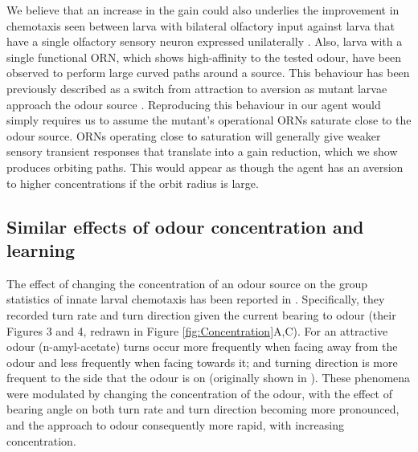 \documentclass[11pt,a4paper]{article}
\newcommand{\todoML}[1]{\todo[author=ML,color=white, size=\tiny,inline]{#1}}
\begin{document}
We believe that an increase in the gain could also underlies the improvement in chemotaxis seen between larva with bilateral olfactory input against larva that have a single olfactory sensory neuron expressed unilaterally  \citep{louis2008bilateral}. 
  Also, larva with a single functional ORN, which shows high-affinity to the tested odour, have been observed to perform large curved paths around a source. This behaviour has been previously described as a switch from attraction to aversion as mutant larvae approach the odour source \citep{gomez2011active, kreher2008translation}. %
  Reproducing this behaviour in our agent would simply requires us to assume the mutant's operational ORNs saturate close to the odour source. ORNs operating close to saturation will generally give weaker sensory transient responses that translate into a gain reduction, which we show produces orbiting paths. This would appear as though the agent has an aversion to higher concentrations if the orbit radius is large.
 
 


\subsection{Similar effects of odour concentration and learning}
The effect of changing the concentration of an odour source on the group statistics of innate larval chemotaxis has been reported in \citep{schleyer2015learning}. Specifically, they recorded turn rate and turn direction given the current bearing to odour (their Figures 3 and 4, redrawn in Figure \ref{fig:Concentration}A,C). For an attractive odour (n-amyl-acetate) turns occur more frequently when facing away from the odour and less frequently when facing towards it; and turning direction is more frequent to the side that the odour is on (originally shown in \citet{gomez2011active}). These phenomena were modulated by changing the concentration of the odour, with the effect of bearing angle on both turn rate and turn direction becoming more pronounced, and the approach to odour consequently more rapid, with increasing concentration. 
\end{document}
